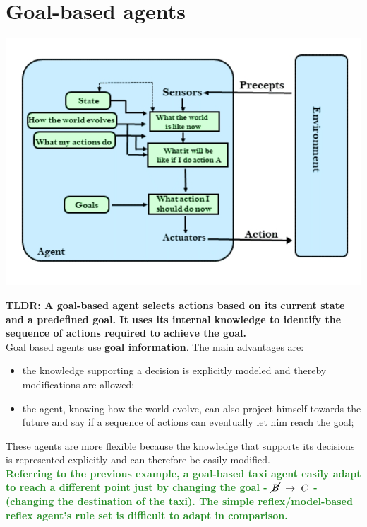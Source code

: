 \documentclass{article}
\begin{document}
\newpage

\section{Goal-based agents}

\begin{center}
    \includegraphics[scale=0.4]{images/goal_based_agent.jpg}
\end{center}

\textbf{TLDR: A goal-based agent selects actions based on its current state and a predefined goal. It uses its internal knowledge to identify the sequence of actions required to achieve the goal.} \\

Goal based agents use \textbf{goal information}. The main advantages are:

\begin{itemize}
    \item the knowledge supporting a decision is explicitly modeled and thereby modifications are allowed;
    \item the agent, knowing how the world evolve, can also project himself towards the future and say if a sequence of actions can eventually let him reach the goal;
\end{itemize}

These agents are more flexible because the knowledge that supports its decisions is represented explicitly and can therefore be easily modified. \\

\textcolor{ForestGreen}{\textbf{Referring to the previous example, a goal-based taxi agent easily adapt to reach a different point just by changing the goal - $\cancel{B}\ \rightarrow\ C$ - (changing the destination of the taxi). The simple reflex/model-based reflex agent's rule set is difficult to adapt in comparison.}} 
\end{document}
